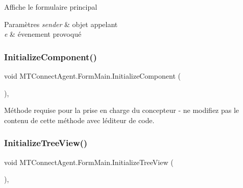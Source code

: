 Affiche le formulaire principal 


\begin{DoxyParams}{Paramètres}
{\em sender} & objet appelant\\
\hline
{\em e} & évenement provoqué\\
\hline
\end{DoxyParams}
\mbox{\label{class_m_t_connect_agent_1_1_form_main_adcf40eec3a3bf56148d6cd5fbdeda2c5}} 
\subsubsection{\texorpdfstring{Initialize\+Component()}{InitializeComponent()}}
{\footnotesize\ttfamily void M\+T\+Connect\+Agent.\+Form\+Main.\+Initialize\+Component (\begin{DoxyParamCaption}{ }\end{DoxyParamCaption})\hspace{0.3cm}{\ttfamily [inline]}, {\ttfamily [private]}}



Méthode requise pour la prise en charge du concepteur -\/ ne modifiez pas le contenu de cette méthode avec l\textquotesingle{}éditeur de code. 

\mbox{\label{class_m_t_connect_agent_1_1_form_main_a90b43ceba6da9143b98ded12f0d31a5e}} 
\subsubsection{\texorpdfstring{Initialize\+Tree\+View()}{InitializeTreeView()}}
{\footnotesize\ttfamily void M\+T\+Connect\+Agent.\+Form\+Main.\+Initialize\+Tree\+View (\begin{DoxyParamCaption}{ }\end{DoxyParamCaption})\hspace{0.3cm}{\ttfamily [inline]}, {\ttfamily [private]}}



